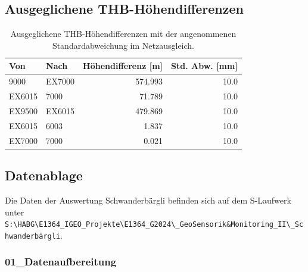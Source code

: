 \subsection{Ausgeglichene THB-Höhendifferenzen}
\label{subsec:hoehendifferenzen}

\begin{table}[htbp]
    \centering
    \caption{Ausgeglichene THB-Höhendifferenzen mit der angenommenen Standardabweichung im Netzausgleich.}
    \label{tab:hoehendifferenzen}
    \begin{tabular}{llrr}
        \toprule
        \textbf{Von} & \textbf{Nach} & \textbf{Höhendifferenz [m]} & \textbf{Std. Abw. [mm]} \\
        \midrule
        9000   & EX7000 & 574.993 & 10.0 \\
        \rowcolor{lightgray}
        EX6015 & 7000   &  71.789 & 10.0 \\
        EX9500 & EX6015 & 479.869 & 10.0 \\
        \rowcolor{lightgray}
        EX6015 & 6003   &   1.837 & 10.0 \\
        EX7000 & 7000   &   0.021 & 10.0 \\
        \bottomrule
    \end{tabular}
\end{table}

\newpage
\subsection{Datenablage}
\label{subsec:datenstruktur}
Die Daten der Auswertung Schwanderbärgli befinden sich auf dem S-Laufwerk unter\\
\texttt{S:\textbackslash\allowbreak HABG\textbackslash\allowbreak E1364\_IGEO\_Projekte\textbackslash\allowbreak E1364\_G2024\textbackslash{}\_GeoSensorik\&Monitoring\_II\textbackslash{}\_Schwanderbärgli}.

\setlength{\DTbaselineskip}{11.5pt}
\renewcommand*{\DTstyle}{\small}

\subsubsection*{01\_Datenaufbereitung}
\vspace{0.6\baselineskip}

